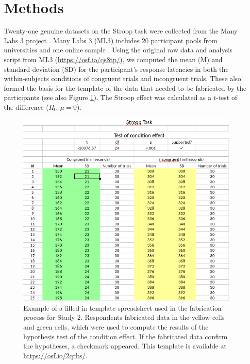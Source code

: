 \documentclass{article}
\begin{document}
\section*{Methods}


Twenty-one genuine datasets on the Stroop task were collected from the Many Labs 3 project \citep[\url{https://osf.io/n8xa7/};][]{Ebersole201668}. Many Labs 3 (ML3) includes 20 participant pools from universities and one online sample \citep[the original preregistration mentioned 20 datasets, accidentally overlooking the online sample;][]{10.3897/rio.2.e8860}. Using the original raw data and analysis script from ML3 (\url{https://osf.io/qs8tp/}), we computed the mean (M) and standard deviation (SD) for the participant's response latencies in both the within-subjects conditions of congruent trials and incongruent trials. These also formed the basis for the template of the data that needed to be fabricated by the participants (see also Figure \ref{spreadsheet2}). The Stroop effect was calculated as a $t$-test of the difference ($H_0:\mu=0$).

\begin{figure}
\begin{center}
\includegraphics[width=\textwidth,height=\textheight,keepaspectratio]{../figures/spreadsheet2.png}
\caption{Example of a filled in template spreadsheet used in the fabrication process for Study 2. Respondents fabricated data in the yellow cells and green cells, which were used to compute the results of the hypothesis test of the condition effect. If the fabricated data confirm the hypotheses, a checkmark appeared. This template is available at \url{https://osf.io/2qrbs/}.}
\label{spreadsheet2}
\end{center}
\end{figure}
\end{document}

